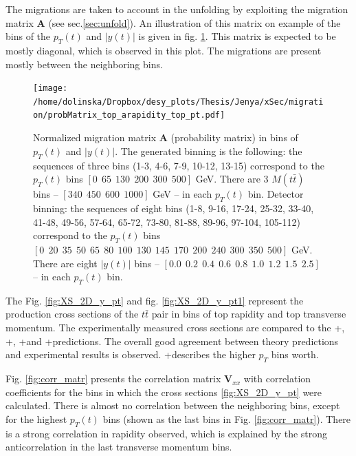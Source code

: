The migrations are taken to account in the unfolding by exploiting the migration matrix $\mathbf{A}$ (see sec.\ref{sec:unfold}). An illustration 
of this matrix on example of the bins of the $p_{T}(t)$ and $|y(t)|$ is given in fig. \ref{fig:MigMat_2D_y_pt}. This matrix is expected to be mostly 
diagonal, which is observed in this plot. The migrations are present mostly between the neighboring bins.

\begin{figure}[t]
  \centering
  \texttt{[image: /home/dolinska/Dropbox/desy\_plots/Thesis/Jenya/xSec/migration/probMatrix\_top\_arapidity\_top\_pt.pdf]}
  \caption{Normalized migration matrix $\mathbf{A}$ (probability matrix) in bins of $p_{T}(t)$ and $|y(t)|$. The generated binning is the following:
          the sequences of three bins (1-3, 4-6, 7-9, 10-12, 13-15) correspond to the $p_{T}(t)$ bins $[0\:\:65\:\:130\:\:200\:\:300\:\:500]$ GeV.
          There are 3 $M(t\bar{t})$ bins -- $[340\:\:450\:\:600\:\:1000]$ GeV -- in each $p_{T}(t)$ bin.
          Detector binning:
          the sequences of eight bins (1-8, 9-16, 17-24, 25-32, 33-40, 41-48, 49-56, 57-64, 65-72, 73-80, 81-88, 89-96, 97-104, 105-112) correspond 
          to the $p_{T}(t)$ bins $[0\:\:20\:\:35\:\:50\:\:65\:\:80\:\:100\:\:130\:\:145\:\:170\:\:200\:\:240\:\:300\:\:350\:\:500]$ GeV.
          There are eight $|y(t)|$ bins -- $[0.0\:\:0.2\:\:0.4\:\:0.6\:\:0.8\:\:1.0\:\:1.2\:\:1.5\:\:2.5]$ -- in each $p_{T}(t)$ bin.}
  \label{fig:MigMat_2D_y_pt}
\end{figure}

The Fig. \ref{fig:XS_2D_y_pt} and fig. \ref{fig:XS_2D_y_pt1} represent the production cross sections of the $t\bar{t}$ pair in bins of top rapidity and top transverse momentum.
The experimentally measured cross sections are compared to the \MG+\PYTHIA, \Powheg+\PYTHIA, \Powheg+\HERWIG and \MCNLO+\HERWIG predictions.
The overall good agreement between theory predictions and experimental results is observed. \MG+\PYTHIA describes the higher $p_{T}$ bins
worth.

Fig. \ref{fig:corr_matr} presents the correlation matrix $\mathbf{V}_{xx}$ with correlation coefficients for the bins in which the 
cross sections \ref{fig:XS_2D_y_pt} were calculated. There is almost no correlation between the neighboring bins, except for the highest $p_{T}(t)$
bins (shown as the last bins in Fig. \ref{fig:corr_matr}). There is a strong correlation in rapidity observed, which is explained by the strong 
anticorrelation in the last transverse momentum bins.

